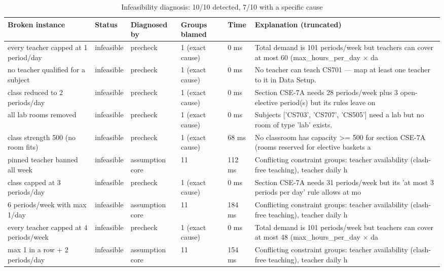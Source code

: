 \begin{table}[t]
\centering
\small
\begin{tabular}{llllll}
\toprule
Broken instance & Status & Diagnosed by & Groups blamed & Time & Explanation (truncated) \\
\midrule
every teacher capped at 1 period/day & infeasible & precheck & 1 (exact cause) & 0 ms & Total demand is 101 periods/week but teachers can cover at most 60 (max\_hours\_per\_day $\times$ da \\
no teacher qualified for a subject & infeasible & precheck & 1 (exact cause) & 0 ms & No teacher can teach CS701 — map at least one teacher to it in Data Setup. \\
class reduced to 2 periods/day & infeasible & precheck & 1 (exact cause) & 0 ms & Section CSE-7A needs 28 periods/week plus 3 open-elective period(s) but its rules leave on \\
all lab rooms removed & infeasible & precheck & 1 (exact cause) & 0 ms & Subjects ['CS703', 'CS707', 'CS505'] need a lab but no room of type 'lab' exists. \\
class strength 500 (no room fits) & infeasible & precheck & 1 (exact cause) & 68 ms & No classroom has capacity >= 500 for section CSE-7A (rooms reserved for elective baskets a \\
pinned teacher banned all week & infeasible & assumption core & 11 & 112 ms & Conflicting constraint groups: teacher availability (clash-free teaching), teacher daily h \\
class capped at 3 periods/day & infeasible & precheck & 1 (exact cause) & 0 ms & Section CSE-7A needs 31 periods/week but its 'at most 3 periods per day' rule allows at mo \\
6 periods/week with max 1/day & infeasible & assumption core & 11 & 184 ms & Conflicting constraint groups: teacher availability (clash-free teaching), teacher daily h \\
every teacher capped at 4 periods/week & infeasible & precheck & 1 (exact cause) & 0 ms & Total demand is 101 periods/week but teachers can cover at most 48 (max\_hours\_per\_day $\times$ da \\
max 1 in a row + 2 periods/day & infeasible & assumption core & 11 & 154 ms & Conflicting constraint groups: teacher availability (clash-free teaching), teacher daily h \\
\bottomrule
\end{tabular}
\caption{Infeasibility diagnosis: 10/10 detected, 7/10 with a specific cause}
\label{tab:t8-infeasibility}
\end{table}
